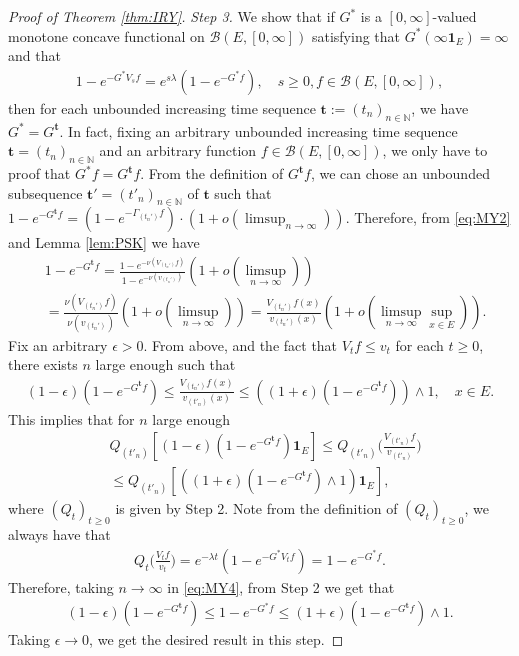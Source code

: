 \documentclass[12pt,a4paper]{amsart}
\numberwithin{equation}{section}
\theoremstyle{plain}
\theoremstyle{definition}
\begin{document}
\begin{proof}[Proof of Theorem \ref{thm:IRY}]
\emph{Step 3.} 
  We show that if $G^*$ is a $[0,\infty]$-valued monotone concave functional on $\mathcal B(E,[0,\infty])$ satisfying that $G^*(\infty \mathbf 1_E) = \infty$ and that 
  \begin{align}
    1 - e^{- G^* V_sf} = e^{s\lambda} (1- e^{- G^* f}),
    \quad s \geq 0, f \in \mathcal B(E, [0,\infty]),
  \end{align}
  then for each unbounded increasing time sequence $\mathbf t:= (t_n)_{n\in \mathbb N}$, we have $G^* = G^{\mathbf t}$.
  In fact, fixing an arbitrary unbounded increasing time sequence $\mathbf t=(t_n)_{n\in \mathbb N}$ and an arbitrary function $f\in \mathcal B(E,[0,\infty])$, we only have to proof that $G^* f = G^{\mathbf t}f$.
From the definition of $G^{\mathbf t}f$, we can chose an unbounded subsequence $\mathbf t'=(t'_n)_{n \in \mathbb N}$ of $\mathbf t$ such that $ 1 - e^{- G^{\mathbf t}f} =  ( 1 - e^{-\Gamma_{( t_n')} f} ) \cdot (1+ o(\limsup_{n\to \infty})). $
Therefore, from \eqref{eq:MY2} and  Lemma \ref{lem:PSK} we have
\begin{align}
  & 1 - e^{- G^{\mathbf t}f}
  = \frac{1 - e^{- \nu( V_{(t_n')}f)}}{1- e^{- \nu(v_{(t_n')})}}  (1+o(\limsup_{n\to \infty})) \\
  & = \frac{\nu (V_{(t_n')} f)}{\nu(v_{(t_n')})}(1+o(\limsup_{n\to \infty})) 
  =  \frac{V_{(t_n')}f(x)}{v_{(t_n')}(x)} ( 1 + o(\limsup_{n \to \infty} \sup_{x\in E})).
\end{align}
Fix an arbitrary $\epsilon > 0$. 
From above, and the fact that $V_tf \leq v_t$ for each $t\geq 0$, there exists $n$ large enough such that
\begin{align}
  (1-\epsilon) (1 - e^{- G^{\mathbf t}f} )
  \leq \frac{V_{(t_n')}f(x)}{v_{(t'_n)}(x)}
  \leq ((1+\epsilon) ( 1 - e^{- G^{\mathbf t}f} )) \wedge 1,
  \quad x\in E.
\end{align}
This implies that for $n$ large enough 
\begin{align}
  \label{eq:MY4}
  & Q_{(t'_n)}[ (1-\epsilon) (1-e^{-G^{\mathbf t}f})\mathbf 1_E ]
    \leq Q_{(t'_n)}\Big( \frac{V_{(t'_n)}f}{v_{(t'_n)}} \Big) 
  \\ &  \leq Q_{(t'_n)}[ ( (1+\epsilon) (1-e^{-G^{\mathbf t}f}) \wedge 1) \mathbf 1_E ],
\end{align}
where $(Q_t)_{t\geq 0}$ is given by Step 2.
Note from the definition of $(Q_t)_{t\geq 0}$, we always have that
\begin{align}
	Q_t \Big( \frac{V_tf}{v_t}  \Big) 
  = e^{- \lambda t}( 1 - e^{- G^*V_tf}  )
  = 1- e^{- G^* f}.
\end{align}	
Therefore, taking $n \to \infty$ in \eqref{eq:MY4}, from Step 2 we get that
\begin{align}
	(1 - \epsilon) (1 - e^{- G^{\mathbf t}f})
  \leq 1 - e^{- G^* f} 
  \leq (1 + \epsilon) (1 - e^{- G^{\mathbf t} f})\wedge 1.
\end{align}
Taking $\epsilon \to 0$, we get the desired result in this step.


\end{proof}
\end{document}
